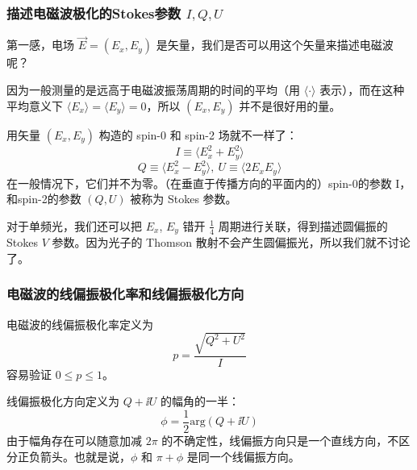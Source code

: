\documentclass[CJK,13pt]{beamer}
\begin{document}


  \begin{frame}
    \frametitle{描述电磁波极化的Stokes参数 $I, Q, U$}
    第一感，电场 $\vec{E} = (E_x, E_y )$ 是矢量，我们是否可以用这个矢量来描述电磁波呢？

    因为一般测量的是远高于电磁波振荡周期的时间的平均（用 $\langle\cdot\rangle$ 表示），而在这种平均意义下 $\langle E_x\rangle = \langle E_y\rangle = 0$，所以 $(E_x, E_y)$ 并不是很好用的量。

    用矢量 $(E_x, E_y)$ 构造的 spin-0 和 spin-2 场就不一样了：
    $$ I \equiv \langle E_x^2+E_y^2 \rangle $$
    $$ Q \equiv \langle E_x^2-E_y^2 \rangle,\ U \equiv \langle 2E_xE_y \rangle  $$    
    在一般情况下，它们并不为零。（在垂直于传播方向的平面内的）spin-0的参数 I，和spin-2的参数 $(Q, U)$ 被称为 Stokes 参数。

    
    对于单频光，我们还可以把 $E_x$, $E_y$ 错开 $\frac{1}{4}$ 周期进行关联，得到描述圆偏振的 Stokes $V$ 参数。因为光子的 Thomson 散射不会产生圆偏振光，所以我们就不讨论了。    
  \end{frame}

  \begin{frame}
    \frametitle{电磁波的线偏振极化率和线偏振极化方向}
    电磁波的线偏振极化率定义为
    $$ p = \frac{\sqrt{Q^2+U^2}}{I}$$
    容易验证 $0\le p\le 1$。
    
    线偏振极化方向定义为 $ Q+\ii U $ 的幅角的一半：
    $$\phi = \frac{1}{2}\mathrm{arg}(Q+\ii U)$$
    由于幅角存在可以随意加减 $2\pi$ 的不确定性，线偏振方向只是一个直线方向，不区分正负箭头。也就是说，$\phi$ 和 $\pi + \phi$ 是同一个线偏振方向。
  \end{frame}
  
  
  \ech
\end{document}
